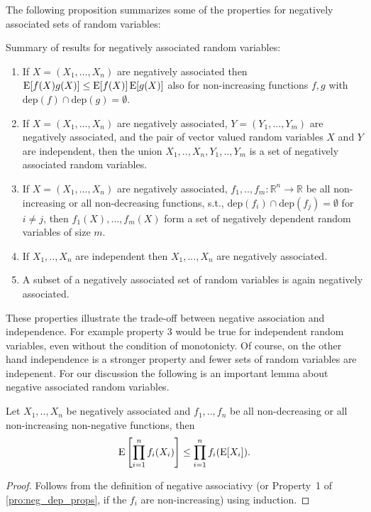 The following proposition summarizes some of the properties for negatively associated sets of random variables: 
\begin{proposition}\label{pro:neg_dep_props}
Summary of results for negatively associated random variables: 
\begin{enumerate}
\item If $X=(X_1,\ldots,X_n)$ are negatively associated then $\operatorname{\mathrm{E}} [f(X) g(X)] \leq \operatorname{\mathrm{E}} [f(X)] \operatorname{\mathrm{E}} [g(X)]$ also for non-increasing functions $f,g$ with $\mathrm{dep}(f) \cap \mathrm{dep}(g) = \emptyset$.
\item If $X=(X_1,\ldots,X_n)$ are negatively associated, $Y=(Y_1,\ldots,Y_m)$ are negatively associated, and the pair of vector valued random variables $X$ and $Y$ are independent, then the union $X_1,..,X_n,Y_1,..,Y_m$ is a set of negatively associated random variables.
\item If $X=(X_1,\ldots,X_n)$ are negatively associated, $f_1,..,f_m : \mathbb R^n \rightarrow \mathbb R$ be all non-increasing or all non-decreasing functions, s.t., $\mathrm{dep}(f_i) \cap \mathrm{dep}(f_j) = \emptyset$ for $i \neq j$, then $f_1(X),\ldots,f_m(X)$ form a set of negatively dependent random variables of size $m$.
\item If $X_1,..,X_n$ are independent then $X_1,...,X_n$ are negatively associated.
\item A subset of a negatively associated set of random variables is again negatively associated.
\end{enumerate}
\end{proposition}

These properties illustrate the trade-off between negative association and independence.
For example property 3 would be true for independent random variables, even without the condition of monotonicty.
Of course, on the other hand independence is a stronger property and fewer sets of random variables are indepenent.
For our discussion the following is an important lemma about negative associated random variables.

\begin{lemma}\label{le:neg_assoc_prod}
Let $X_1,..,X_n$ be negatively associated and $f_1,..,f_n$ be all non-decreasing or all non-increasing non-negative functions, then
\[
  \operatorname{\mathrm{E}} \left[\prod_{i=1}^{n} f_i(X_i)\right] \leq \prod_{i=1}^{n} f_i(\operatorname{\mathrm{E}} [X_i]) \textrm{.}
\]
\end{lemma}
\begin{proof}
Follows from the definition of negative associativy (or Property~1 of \cref{pro:neg_dep_props}, if the $f_i$ are non-increasing) using induction.
\end{proof}

